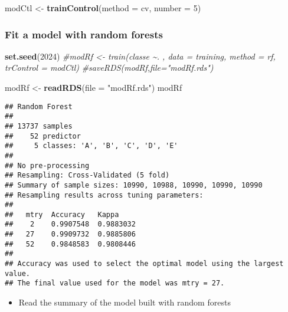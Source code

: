 \documentclass[
]{article}
\newenvironment{Shaded}{\begin{snugshade}}{\end{snugshade}}
\newcommand{\AttributeTok}[1]{\textcolor[rgb]{0.13,0.29,0.53}{#1}}
\newcommand{\CommentTok}[1]{\textcolor[rgb]{0.56,0.35,0.01}{\textit{#1}}}
\newcommand{\DecValTok}[1]{\textcolor[rgb]{0.00,0.00,0.81}{#1}}
\newcommand{\FunctionTok}[1]{\textcolor[rgb]{0.13,0.29,0.53}{\textbf{#1}}}
\newcommand{\NormalTok}[1]{#1}
\newcommand{\OtherTok}[1]{\textcolor[rgb]{0.56,0.35,0.01}{#1}}
\newcommand{\SpecialCharTok}[1]{\textcolor[rgb]{0.81,0.36,0.00}{\textbf{#1}}}
\newcommand{\StringTok}[1]{\textcolor[rgb]{0.31,0.60,0.02}{#1}}
\providecommand{\tightlist}{%
  \setlength{\itemsep}{0pt}\setlength{\parskip}{0pt}}
\begin{document}
\begin{Shaded}
\begin{Highlighting}[]
\NormalTok{modCtl }\OtherTok{\textless{}{-}} \FunctionTok{trainControl}\NormalTok{(}\AttributeTok{method =} \StringTok{\textquotesingle{}cv\textquotesingle{}}\NormalTok{, }\AttributeTok{number =} \DecValTok{5}\NormalTok{)}
\end{Highlighting}
\end{Shaded}

\hypertarget{fit-a-model-with-random-forests}{%
\subsubsection{Fit a model with random
forests}\label{fit-a-model-with-random-forests}}

\begin{Shaded}
\begin{Highlighting}[]
\FunctionTok{set.seed}\NormalTok{(}\DecValTok{2024}\NormalTok{)}
\CommentTok{\#modRf \textless{}{-} train(classe \textasciitilde{}. , data = training, method = \textquotesingle{}rf\textquotesingle{}, trControl = modCtl)}
\CommentTok{\#saveRDS(modRf,file="modRf.rds")}

\NormalTok{modRf }\OtherTok{\textless{}{-}} \FunctionTok{readRDS}\NormalTok{(}\AttributeTok{file =} \StringTok{"modRf.rds"}\NormalTok{)}
\NormalTok{modRf}
\end{Highlighting}
\end{Shaded}

\begin{verbatim}
## Random Forest 
## 
## 13737 samples
##    52 predictor
##     5 classes: 'A', 'B', 'C', 'D', 'E' 
## 
## No pre-processing
## Resampling: Cross-Validated (5 fold) 
## Summary of sample sizes: 10990, 10988, 10990, 10990, 10990 
## Resampling results across tuning parameters:
## 
##   mtry  Accuracy   Kappa    
##    2    0.9907548  0.9883032
##   27    0.9909732  0.9885806
##   52    0.9848583  0.9808446
## 
## Accuracy was used to select the optimal model using the largest value.
## The final value used for the model was mtry = 27.
\end{verbatim}

\begin{itemize}
\tightlist
\item
  Read the summary of the model built with random forests
\end{itemize}

\begin{Shaded}
\end{Shaded}
\end{document}
